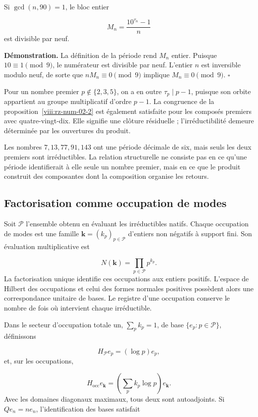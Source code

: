 Si $\gcd(n,90)=1$, le bloc entier

\[
M_n=\frac{10^{\tau_n}-1}{n}
\]
est divisible par neuf.

\textbf{Démonstration.} La définition de la période rend $M_n$ entier. Puisque $10\equiv1\pmod9$, le numérateur est divisible par neuf. L'entier $n$ est inversible modulo neuf, de sorte que $nM_n\equiv0\pmod9$ implique $M_n\equiv0\pmod9$. \hfill\(\square\)

Pour un nombre premier $p\notin\{2,3,5\}$, on a en outre $\tau_p\mid p-1$, puisque son orbite appartient au groupe multiplicatif d’ordre $p-1$. La congruence de la proposition~\ref{viii:rz-num-02-2} est également satisfaite pour les composés premiers avec quatre-vingt-dix. Elle signifie une clôture résiduelle ; l’irréductibilité demeure déterminée par les ouvertures du produit.

Les nombres $7,13,77,91,143$ ont une période décimale de six, mais seuls les deux premiers sont irréductibles. La relation structurelle ne consiste pas en ce qu'une période identifierait à elle seule un nombre premier, mais en ce que le produit construit des composantes dont la composition organise les retours.

\subsection{Factorisation comme occupation de modes}
Soit $\mathcal P$ l'ensemble obtenu en évaluant les irréductibles natifs. Chaque occupation de modes est une famille $\mathbf k=(k_p)_{p\in\mathcal P}$ d'entiers non négatifs à support fini. Son évaluation multiplicative est

\[
N(\mathbf k)=\prod_{p\in\mathcal P}p^{k_p}.
\]
La factorisation unique identifie ces occupations aux entiers positifs. L’espace de Hilbert des occupations et celui des formes normales positives possèdent alors une correspondance unitaire de bases. Le registre d’une occupation conserve le nombre de fois où intervient chaque irréductible.

Dans le secteur d'occupation totale un, \(\sum_p k_p=1\), de base \(\{e_p:p\in\mathcal P\}\), définissons

\[
H_{\mathcal P}e_p=(\log p)e_p,
\]
et, sur les occupations,

\[
H_{\mathrm{occ}}e_{\mathbf k}
=\left(\sum_pk_p\log p\right)e_{\mathbf k}.
\]
Avec les domaines diagonaux maximaux, tous deux sont autoadjoints. Si $Qe_n=ne_n$, l'identification des bases satisfait


